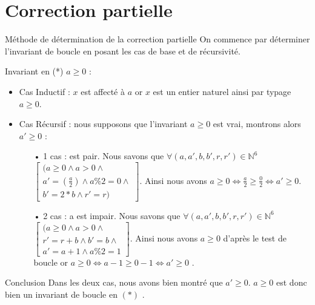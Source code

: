 \documentclass[12pt,a4paper]{report}
\begin{document}
\section{Correction partielle}
\begin{mybox}{Méthode de détermination de la correction partielle}
On commence par déterminer l'invariant de boucle en posant les cas de base
et de récursivité.
\end{mybox}
\begin{flushleft}
Invariant en (*) $  a\geq 0 $  : \\
\begin{itemize}
\item Cas Inductif :  $x$ est affect\'{e} \`{a} $a$ or $x$ est un entier naturel ainsi par typage $a\ge 0$.
\item Cas Récursif : nous supposons que l'invariant  $a\ge 0$ est vrai, montrons alors $ a' \geq 0 $ :
\begin{itemize}
\item[•]  1 cas :  est pair. Nous savons que $\forall(a,a',b,b',r,r')\in \mathbb{N}^{6}$ $\left[ \begin{array}{c}(a\ge 0\wedge a>0\wedge \\
   a '=(\frac{a}{2})\wedge a\%2=0 \wedge \\
b '=2*b\wedge r '=r)\end{array}
\right]$. Ainsi nous avons $a\ge 0\Leftrightarrow \frac{a}{2}\ge \frac{0}{2}\Leftrightarrow a ' \ge 0$.
\item[•] 2 cas : a est impair. Nous savons que $\forall(a,a',b,b',r,r')\in \mathbb{N}^{6}$ $\left[ \begin{array}{c}(a\ge 0\wedge a>0\wedge \\
   r '= r+b\wedge b'=b  \wedge \\
a '=a+1\wedge a\%2=1\end{array}
\right]$. Ainsi nous avons  $a\ge 0$ d’après le test de boucle or  $  a\geq 0  \Leftrightarrow a-1 \ge 0-1 \Leftrightarrow a' \ge 0$ .
\bigskip
\end{itemize}
\end{itemize}
\begin{Cas1}{Conclusion}
 Dans les deux cas, nous avons bien montré que  $ a' \ge 0 $. $a \geq 0$ est donc bien un invariant de boucle en $(*)$ .
\end{Cas1}
\end{flushleft}
\end{document}
